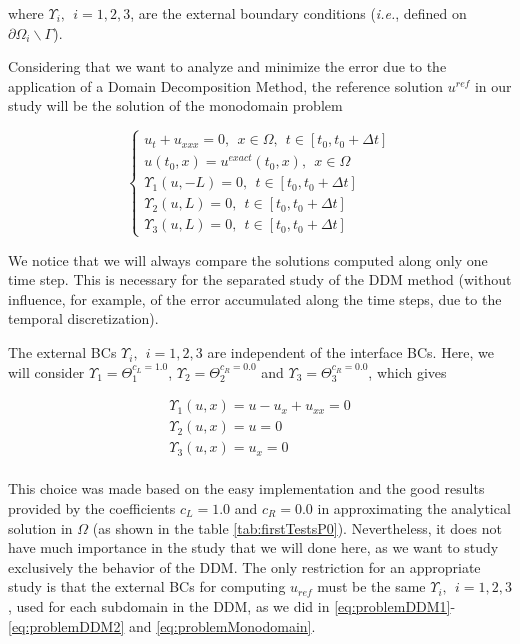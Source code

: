 \noindent where $ \Upsilon_i, \ \ i=1,2,3$, are the external boundary conditions (\emph{i.e.}, defined on $\partial \Omega_i \backslash \Gamma$).

\indent Considering that we want to analyze and minimize the error due to the application of a Domain Decomposition Method, the reference solution $u^{ref}$ in our study will be the solution of the monodomain problem

\begin{equation}
	\label{eq:problemMonodomain}
	\begin{cases}
	u_t + u_{xxx} = 0, \ \ x \in \Omega, \ \ t \in [t_0, t_0+\Delta t] \\
	u(t_0,x) = u^{exact}(t_0,x) , \ \ x \in \Omega \\ 
	\Upsilon_1(u,-L) = 0, \ \ t \in [t_0, t_0+\Delta t] \\
	\Upsilon_2(u,L) = 0, \ \ t \in [t_0, t_0+\Delta t] \\
	\Upsilon_3(u,L) = 0, \ \ t \in [t_0, t_0+\Delta t]
	\end{cases}
\end{equation}
	
\indent We notice that we will always compare the solutions computed along only one time step. This is necessary for the separated study of the DDM method (without influence, for example, of the error accumulated along the time steps, due to the temporal discretization).

\indent The external BCs $ \Upsilon_i, \ \ i=1,2,3$ are independent of the interface BCs. Here, we will consider $\Upsilon_1 = \Theta_1^{c_L = 1.0}$, $\Upsilon_2 = \Theta_2^{c_R = 0.0}$ and $\Upsilon_3 = \Theta_3^{c_R = 0.0}$, which gives

\begin{equation}
	\label{eq:externalBCsDDM}
	\begin{gathered}
	\Upsilon_1(u,x) = u - u_x + u_{xx} = 0\\
	\Upsilon_2(u,x) = u = 0\\
	\Upsilon_3(u,x) = u_x = 0\\
	\end{gathered}
\end{equation}

\indent This choice was made based on the easy implementation and the good results provided by the coefficients $c_L = 1.0$ and $c_R = 0.0$ in approximating the analytical solution in $\Omega$ (as shown in the table \ref{tab:firstTestsP0}). Nevertheless, it does not have much importance in the study that we will done here, as we want to study exclusively the behavior of the DDM. The only restriction for an appropriate study is that the external BCs for computing $u_{ref}$ must be the same $\Upsilon_i, \ \ i=1,2,3$, used for each subdomain in the DDM, as we did in \eqref{eq:problemDDM1}-\eqref{eq:problemDDM2} and \eqref{eq:problemMonodomain}.

